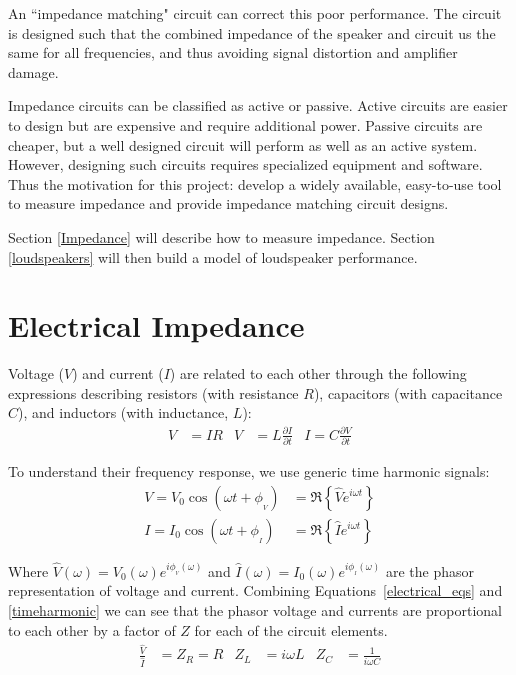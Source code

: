 \documentclass[10pt]{book}
\begin{document}
An ``impedance matching" circuit can correct this poor performance. The circuit is designed such that the combined impedance of the speaker and circuit us the same for all frequencies, and thus avoiding signal distortion and amplifier damage.

Impedance circuits can be classified as active or passive. Active circuits are easier to design but are expensive and require additional power. Passive circuits are cheaper, but a well designed circuit will perform as well as an active system. However, designing such circuits requires specialized equipment and software. Thus the motivation for this project: develop a widely available, easy-to-use tool to measure impedance and provide impedance matching circuit designs.

Section \ref{Impedance} will describe how to measure impedance. Section \ref{loudspeakers} will then build a model of loudspeaker performance.
\section{Electrical Impedance}
Voltage ($V$) and current ($I$) are related to each other through the following expressions describing resistors (with resistance $R$), capacitors (with capacitance $C$), and inductors (with inductance, $L$):
\begin{align}\label{electrical_eqs}
V&=IR & V&=L\frac{\partial I}{\partial t} & I=C\frac{\partial V}{\partial t}
\end{align}

To understand their frequency response, we use generic time harmonic signals:
\begin{align}\label{timeharmonic}
V=V_0\cos(\omega t + \phi_{_V})&=\Re{ \left\{ \hat{V}e^{i\omega t}\right\} }\\
I=I_0\cos(\omega t + \phi_{_I})&=\Re{ \left\{ \hat{I}e^{i\omega t}\right\} }
\end{align}

Where $\hat{V}(\omega)=V_0(\omega)e^{i\phi_{_V}(\omega)}$ and $\hat{I}(\omega)=I_0(\omega)e^{i\phi_{_I}(\omega)}$ are the phasor representation of voltage and current. Combining Equations~\ref{electrical_eqs} and \ref{timeharmonic} we can see that the phasor voltage and currents are proportional to each other by a factor of $Z$ for each of the circuit elements.
\begin{align}
\frac{\hat{V}}{\hat{I}}&=Z_R=R & Z_L&=i\omega L & Z_C&=\frac{1}{i\omega C}
\end{align}
\end{document}

